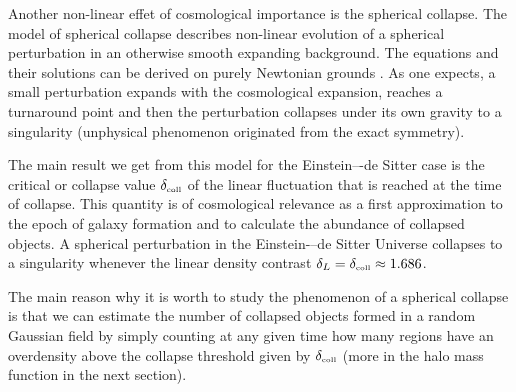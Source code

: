 Another non-linear effet of cosmological importance is the spherical collapse. The model of spherical collapse describes non-linear evolution of a spherical perturbation in an otherwise smooth expanding background. The equations and their solutions can be derived on purely Newtonian grounds \parencite{2010deto.book.....A}. As one expects, a small perturbation expands with the cosmological expansion, reaches a turnaround point and then the perturbation collapses under its own gravity to a singularity (unphysical phenomenon originated from the exact symmetry).

The main result we get from this model for the Einstein–-de Sitter case is the critical or collapse value $\delta_\text{\tiny coll}$ of the linear fluctuation that is reached at the time of collapse. This quantity is of cosmological relevance as a first approximation to the epoch of galaxy formation and to calculate the abundance of collapsed objects. A spherical perturbation in the Einstein-–de Sitter Universe collapses to a singularity whenever the linear density contrast $\delta_L=\delta_\text{\tiny coll}\approx1.686$.

The main reason why it is worth to study the phenomenon of a spherical collapse is that we can estimate the number of collapsed objects formed in a random Gaussian field by simply counting at any given time how many regions have an overdensity above the collapse threshold given by $\delta_\text{\tiny coll}$ (more in the halo mass function in the next section).




